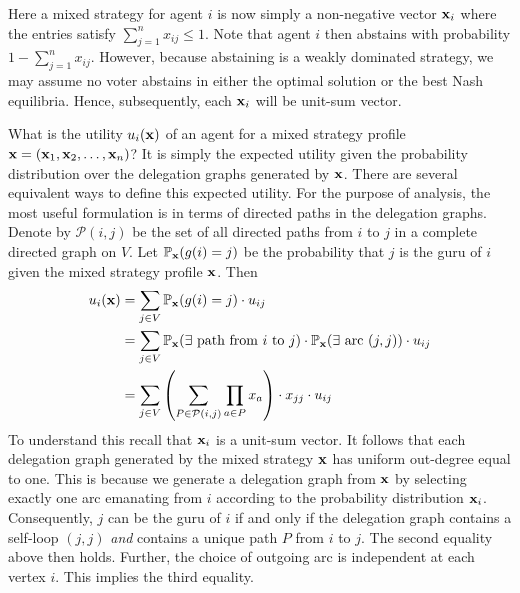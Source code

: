 Here a mixed strategy for agent $i$ is now simply a non-negative vector ${\bf x}_i$ where the entries 
satisfy $\sum_{j=1}^n x_{ij}\le 1$. Note that agent $i$ then abstains with probability $1-\sum_{j=1}^n x_{ij}$.
However, because abstaining is a weakly dominated strategy, we may assume no voter abstains in either the
optimal solution or the best Nash equilibria. Hence, subsequently, each ${\bf x}_i$ will be unit-sum vector.

What is the utility $u_i({\bf x})$ of an agent for a mixed strategy profile ${\bf x}=({\bf x}_1, {\bf x}_2, \dots, {\bf x}_n)$?
It is simply the expected utility  given the probability distribution over the delegation graphs generated by ${\bf x}$.
There are several equivalent ways to define this expected utility. For the purpose of analysis, 
the most useful formulation is in terms of directed paths in the delegation graphs.
Denote by $\mathcal{P}(i,j)$ be the set of all directed paths from $i$ to $j$ in a complete directed graph 
on $V$. Let $\mathbb{P}_{{\bf x}}( g(i)=j)$ be the probability that $j$ is the guru of $i$ given the mixed strategy profile ${\bf x}$. Then
\begin{align*}
	u_i({\bf x}) &= \sum_{j\in V} \mathbb{P}_{{\bf x}}( g(i)=j  ) \cdot u_{ij} \\ 
	 &= \sum_{j\in V} \mathbb{P}_{{\bf x}}( \exists \text{ path from } i \ \text{to} \ j  )\cdot \mathbb{P}_{{\bf x}}(\exists \text{ arc } (j,j) ) \cdot u_{ij}\\
	&=\sum_{j\in V} \left( \sum_{P \in \mathcal{P}(i,j)}  \prod\limits_{a\in P}  x_a \right)  \cdot x_{jj} \cdot u_{ij}
\end{align*}
To understand this recall that ${\bf x}_i$ is a unit-sum vector. It follows that each delegation graph generated by
the mixed strategy ${\bf x}$ has uniform out-degree equal to one.
This is because we generate a delegation graph from ${\bf x}$ by
selecting exactly one arc emanating from $i$ according to the probability distribution ${\bf x}_i$.
Consequently, $j$ can be the guru of $i$ if and only if the delegation graph contains a self-loop $(j,j)$ {\em and} contains 
a unique path $P$ from $i$ to $j$. The second equality above then holds.
Further, the choice of outgoing arc is independent at each vertex $i$. This implies the third equality.

